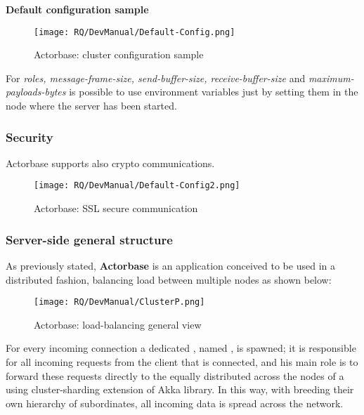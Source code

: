 \documentclass{scalatekids-article}
\begin{document}
\textbf{Default configuration sample}

\begin{figure}[H]
  \begin{center}
    \texttt{[image: RQ/DevManual/Default-Config.png]}
    \caption{Actorbase: cluster configuration sample}
  \end{center}
\end{figure}

For \textit{roles, message-frame-size, send-buffer-size, receive-buffer-size} and \textit{maximum-payloads-bytes} is possible to use environment variables just by setting them in the node where the server has been started.

\subsubsection{Security}

Actorbase supports also crypto communications.

\begin{figure}[H]
  \begin{center}
    \texttt{[image: RQ/DevManual/Default-Config2.png]}
    \caption{Actorbase: SSL secure communication}
  \end{center}
\end{figure}

\newpage
\subsubsection{Server-side general structure}

As previously stated, \textbf{Actorbase} is an application conceived to be used in a distributed fashion,
balancing load between multiple nodes as shown below:

\begin{figure}[H]
  \begin{center}
    \texttt{[image: RQ/DevManual/ClusterP.png]}
    \caption{Actorbase: load-balancing general view}
  \end{center}
\end{figure}

For every incoming connection a dedicated , named
, is spawned; it is responsible for all incoming requests
from the client that is connected, and his main role is to forward these
requests directly to the   equally distributed across
the nodes of a  using cluster-sharding extension of Akka library.
In this way, with   breeding their own hierarchy of
subordinates, all incoming data is spread across the  network.
\end{document}
